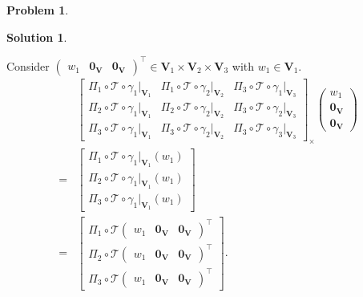 \documentclass{book}
\theoremstyle{definition}
\newtheorem*{prob*}{Problem}
\newtheorem*{sln*}{Solution}
\newcommand{\V}{\mathbf{V}}
\newcommand{\T}{\mathcal{T}}
\begin{document}
\begin{prob*}
\begin{sln*}
\begin{enumerate}
\begin{enumerate}
			Consider $\begin{pmatrix}
			w_1 & \mathbf{0}_\V & \mathbf{0}_\V
			\end{pmatrix}^\top \in \V_1\times\V_2\times\V_3$ with $w_1\in \V_1$.
			\begin{align*}
			&\begin{bmatrix}
			\Pi_1 \circ \T \circ \gamma_1\bigg\vert_{\V_1} & \Pi_1 \circ \T \circ \gamma_2\bigg\vert_{\V_2} & \Pi_3 \circ \T \circ \gamma_1\bigg\vert_{\V_3}\\
			\Pi_2 \circ \T \circ \gamma_1\bigg\vert_{\V_1} & \Pi_2 \circ \T \circ \gamma_2\bigg\vert_{\V_2} & \Pi_3 \circ \T \circ \gamma_2\bigg\vert_{\V_3}\\
			\Pi_3 \circ \T \circ \gamma_1\bigg\vert_{\V_1} & \Pi_3 \circ \T \circ \gamma_2\bigg\vert_{\V_2} & \Pi_3 \circ \T \circ \gamma_3\bigg\vert_{\V_3} 
			\end{bmatrix}_\times
			\begin{pmatrix}
			w_1 \\ \mathbf{0}_\V \\ \mathbf{0}_\V
			\end{pmatrix}\\
			=
			&\begin{bmatrix}
			\Pi_1 \circ \T \circ \gamma_1\bigg\vert_{\V_1}(w_1)\\
			\Pi_2 \circ \T \circ \gamma_1\bigg\vert_{\V_1}(w_1)\\
			\Pi_3 \circ \T \circ \gamma_1\bigg\vert_{\V_1}(w_1)
			\end{bmatrix}\\
			=
			& \begin{bmatrix}
			\Pi_1 \circ \T\begin{pmatrix} w_1 & \mathbf{0}_\V & \mathbf{0}_\V \end{pmatrix}^\top\\
			\Pi_2 \circ \T\begin{pmatrix} w_1 & \mathbf{0}_\V & \mathbf{0}_\V \end{pmatrix}^\top\\
			\Pi_3 \circ \T\begin{pmatrix} w_1 & \mathbf{0}_\V & \mathbf{0}_\V \end{pmatrix}^\top
			\end{bmatrix}.
			\end{align*}
			

\end{enumerate}
\end{enumerate}
\end{sln*}
\end{prob*}
\end{document}

